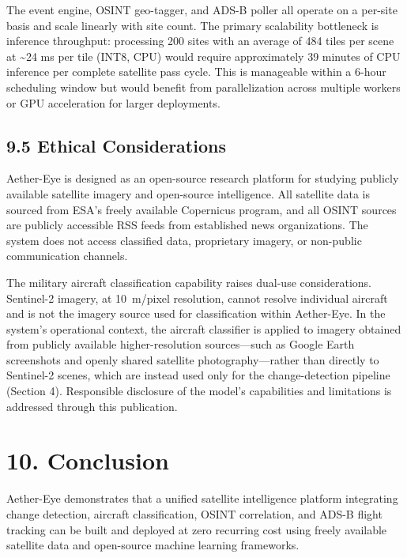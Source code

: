 \documentclass[11pt,a4paper]{article}
\begin{document}
The event engine, OSINT geo-tagger, and ADS-B poller all operate on a per-site basis and scale linearly with site count. The primary scalability bottleneck is inference throughput: processing 200 sites with an average of 484 tiles per scene at \textasciitilde24 ms per tile (INT8, CPU) would require approximately 39 minutes of CPU inference per complete satellite pass cycle. This is manageable within a 6-hour scheduling window but would benefit from parallelization across multiple workers or GPU acceleration for larger deployments.

\hypertarget{ethical-considerations}{%
\subsection{9.5 Ethical Considerations}\label{ethical-considerations}}

Aether-Eye is designed as an open-source research platform for studying publicly available satellite imagery and open-source intelligence. All satellite data is sourced from ESA's freely available Copernicus program, and all OSINT sources are publicly accessible RSS feeds from established news organizations. The system does not access classified data, proprietary imagery, or non-public communication channels.

The military aircraft classification capability raises dual-use considerations. Sentinel-2 imagery, at 10~m/pixel resolution, cannot resolve individual aircraft and is not the imagery source used for classification within Aether-Eye. In the system's operational context, the aircraft classifier is applied to imagery obtained from publicly available higher-resolution sources---such as Google Earth screenshots and openly shared satellite photography---rather than directly to Sentinel-2 scenes, which are instead used only for the change-detection pipeline (Section 4). Responsible disclosure of the model's capabilities and limitations is addressed through this publication.

\hypertarget{conclusion}{%
\section{10. Conclusion}\label{conclusion}}

Aether-Eye demonstrates that a unified satellite intelligence platform integrating change detection, aircraft classification, OSINT correlation, and ADS-B flight tracking can be built and deployed at zero recurring cost using freely available satellite data and open-source machine learning frameworks.
\end{document}
